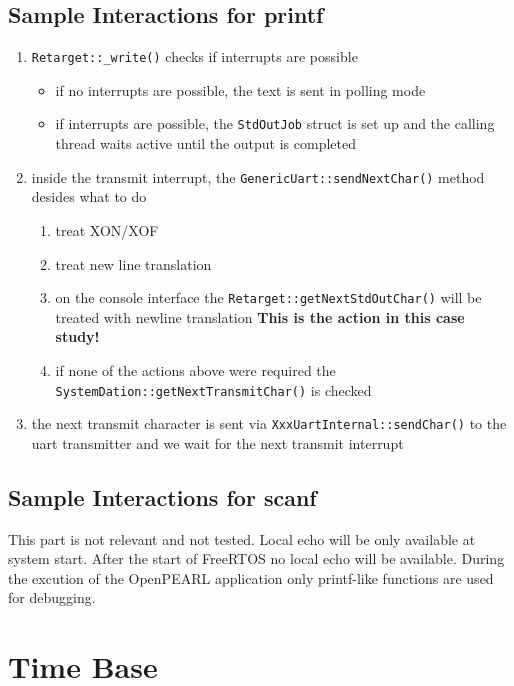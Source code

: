 \subsection{Sample Interactions for printf}
\begin{enumerate}
\item \texttt{Retarget::\_write()} checks if interrupts are possible
  \begin{itemize}
    \item if no interrupts are possible, the text is sent in polling mode
    \item if interrupts are possible, the \texttt{StdOutJob} struct is set up \newline
          and the calling thread waits active until the output is completed
  \end{itemize}
\item inside the transmit interrupt, the \texttt{GenericUart::sendNextChar()} method
    desides what to do 
    \begin{enumerate}
    \item treat XON/XOF
    \item treat new line translation
    \item on the console interface the \texttt{Retarget::getNextStdOutChar()} 
        will be treated with newline translation\newline
        \textbf{This is the action in this case study!}
    \item if none of the actions above were required the \texttt{SystemDation::getNextTransmitChar()}
        is checked
    \end{enumerate}
\item the next transmit character is sent via \texttt{XxxUartInternal::sendChar()} to the 
    uart transmitter and we wait for the next transmit interrupt
\end{enumerate}

\subsection{Sample Interactions for scanf}
This part is not relevant and not tested. Local echo will be only available 
at system start. After the start of FreeRTOS no local echo will be available.
During the excution of the OpenPEARL application only printf-like functions
are used for debugging.


\section{Time Base}

